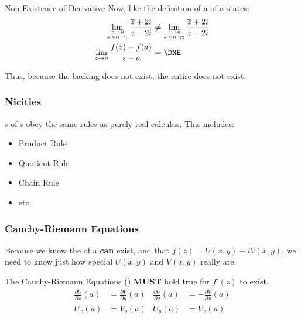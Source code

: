 \begin{example}[Lecture 5]{Non-Existence of Derivative}
  Now, like the definition of a  of a  states:
  \begin{align*}
    \lim\limits_{\substack{z \to a \\ z \text{ on } \Path_{1}}} \frac{\Conjugate{z} + 2i}{z - 2i} &\neq \lim\limits_{\substack{z \to a \\ z \text{ on } \Path_{2}}} \frac{\Conjugate{z} + 2i}{z - 2i} \\
    \lim\limits_{z \to a} \frac{f(z) - f(a)}{z - a} &= \DNE
  \end{align*}

  Thus, because the backing  does not exist, the entire  does not exist.
\end{example}

\subsubsection{Nicities}\label{subsubsec:Complex_Derivative_Nicities}
s of s obey the same rules as purely-real calculus.
This includes:
\begin{itemize}[noitemsep]
\item Product Rule
\item Quotient Rule
\item Chain Rule
\item etc.
\end{itemize}

\subsubsection{Cauchy-Riemann Equations}\label{subsubsec:Cauchy_Riemann_Equations}
Because we know the  of a  \textbf{can} exist, and that $f(z) = U(x, y) + i V(x, y)$, we need to know just how special $U(x, y)$ and $V(x, y)$ really are.

The Cauchy-Riemann Equations () \textbf{MUST} hold true for $f'(z)$ to exist.
\begin{subequations}\label{eq:Cauchy_Riemann_Equations}
  \begin{equation}\label{subeq:Cauchy_Riemann_Equation-UxVy}
    \begin{aligned}
      \frac{\partial U}{\partial x} (a) &= \frac{\partial V}{\partial y} (a) \\
      U_{x} (a) &= V_{y} (a)
    \end{aligned}
  \end{equation}
  \begin{equation}\label{subeq:Cauchy_Riemann_Equation-UyVx}
    \begin{aligned}
      \frac{\partial U}{\partial y} (a) &= -\frac{\partial V}{\partial x} (a) \\
      U_{y} (a) &= V_{x} (a)
    \end{aligned}
  \end{equation}
\end{subequations}

